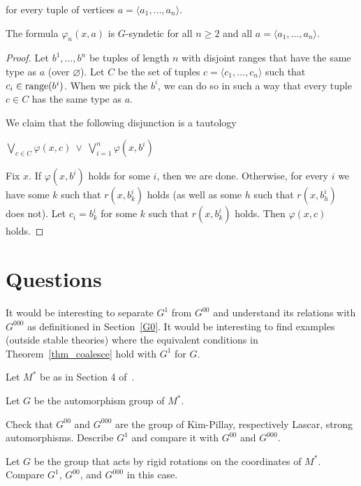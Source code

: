 
for every tuple of vertices $a=\langle a_1,\dots,a_n\rangle$.

\begin{theorem}
  The formula $\varphi_n(x,a)$ is $G$-syndetic for all $n\ge 2$ and all $a=\langle a_1,\ldots,a_n\rangle$.
\end{theorem}

\begin{proof}
  Let $b^1,\ldots,b^n$ be tuples of length $n$ with disjoint ranges that have the same type as $a$ (over $\varnothing$). Let $C$ be the set of tuples $c=\langle c_1,\ldots,c_n\rangle$ such that $c_i\in{\rm range}(b^i)$.
  When we pick the $b^i$, we can do so in such a way that every tuple $c\in C$ has the same type as $a$.  

  We claim that the following disjunction is a tautology

  \hfil$\displaystyle\bigvee_{c\in C}\varphi(x,c)\ \vee\ \bigvee_{i=1}^n \varphi(x,b^i)$

  Fix $x$.
  If $\varphi(x,b^i)$ holds for some $i$, then we are done.
  Otherwise, for every $i$ we have some $k$ such that $r(x,b^i_k)$ holds (as well as some $h$ such that $r(x,b^i_h)$ does not).
  Let $c_i=b^i_k$ for some $k$ such that $r(x,b^i_k)$ holds.
  Then $\varphi(x,c)$ holds.
\end{proof}

\section{Questions}

It would be interesting to separate $G^1$ from $G^{00}$ and understand its relations with $G^{000}$ as definitioned in Section~\ref{G0}.
It would be interesting to find examples (outside stable theories) where the equivalent conditions in Theorem~\ref{thm_coalesce} hold with $G^1$ for $G$.

Let $M^*$ be as in Section 4 of~\cite{CLPZ}. 

\begin{question}
  Let $G$ be the automorphism group of $M^*$.

  Check that $G^{00}$ and $G^{000}$ are the group of Kim-Pillay, respectively Lascar, strong automorphisms.
  Describe $G^1$ and compare it with $G^{00}$ and $G^{000}$.
\end{question}

\begin{question}
  Let $G$ be the group that acts by rigid rotations on the coordinates of $M^*$.
  Compare $G^1$, $G^{00}$, and $G^{000}$ in this case.
\end{question}

